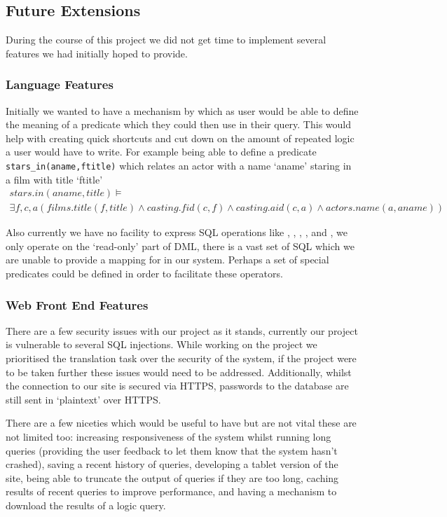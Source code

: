 \documentclass[a4paper, 11pt]{article}
\begin{document}
  \subsection{Future Extensions}
    During the course of this project we did not get time to implement several
    features we had initially hoped to provide.

    \subsubsection{Language Features}
    Initially we wanted to have a mechanism by which as user would be able to
    define the meaning of a predicate which they could then use in their query.
    This would help with creating quick shortcuts and cut down on the amount of 
    repeated logic a user would have to write. For example being able to define a 
    predicate \texttt{stars\_in(aname,ftitle)} which relates an actor with a name 
    `aname' staring in a film with title `ftitle'
    \begin{multline}
      stars.in(aname, title) \models \\ \exists  f,c,a (films.title(f,title) \land
      casting.fid(c,f) \land casting.aid(c,a) \land actors.name(a,aname))
    \end{multline}

    Also currently we have no facility to express SQL operations like
    , , , , and
    , we only operate on the `read-only' part of DML, there is a
    vast set of SQL which we are unable to provide a mapping for in our system.
    Perhaps a set of special predicates could be defined in order to facilitate
    these operators.

    \subsubsection{Web Front End Features}
    There are a few security issues with our project as it stands, currently our 
    project is vulnerable to several SQL injections. While working on the project
    we prioritised the translation task over the security of the system, if the 
    project were to be taken further these issues would need to be addressed. 
    Additionally, whilst the connection to our site is secured via HTTPS, 
    passwords to the database are still sent in `plaintext' over HTTPS.

    There are a few niceties which would be useful to have but are not vital
    these are not limited too: increasing responsiveness of the system whilst 
    running long queries (providing the user feedback to let them know that the
    system hasn't crashed), saving a recent history of queries, developing a 
    tablet version of the site, being able to truncate the output of queries if 
    they are too long, caching results of recent queries to improve performance,
    and having a mechanism to download the results of a logic query.  
\end{document}
